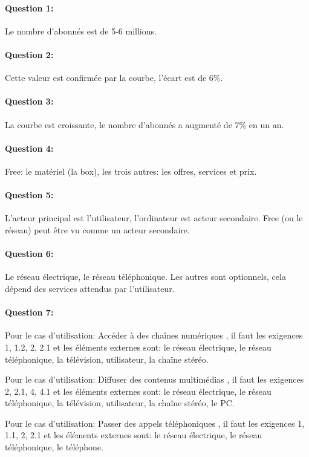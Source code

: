 \paragraph{Question 1:} Le nombre d'abonnés est de 5-6 millions.

\paragraph{Question 2:} Cette valeur est confirmée par la courbe, l'écart est de 6\%.

\paragraph{Question 3:} La courbe est croissante, le nombre d'abonnés a augmenté de 7\% en un an.

\paragraph{Question 4:} Free: le matériel (la box), les trois autres: les offres, services et prix.

\paragraph{Question 5:} L'acteur principal est l'utilisateur, l'ordinateur est acteur secondaire. Free (ou le réseau) peut être vu comme un acteur secondaire.

\paragraph{Question 6:} Le réseau électrique, le réseau téléphonique. Les autres sont optionnels, cela dépend des services attendus par l'utilisateur.

\paragraph{Question 7:} Pour le cas d'utilisation: \og Accéder à des chaînes numériques \fg, il faut les exigences 1, 1.2, 2, 2.1 et les éléments externes sont: le réseau électrique, le réseau téléphonique, la télévision, utilisateur, la chaîne stéréo.

Pour le cas d'utilisation: \og Diffuser des contenus multimédias \fg, il faut les exigences 2, 2.1, 4, 4.1 et les éléments externes sont: le réseau électrique, le réseau téléphonique, la télévision, utilisateur, la chaîne stéréo, le PC.

Pour le cas d'utilisation: \og Passer des appels téléphoniques \fg, il faut les exigences 1, 1.1, 2, 2.1 et les éléments externes sont: le réseau électrique, le réseau téléphonique, le téléphone.

